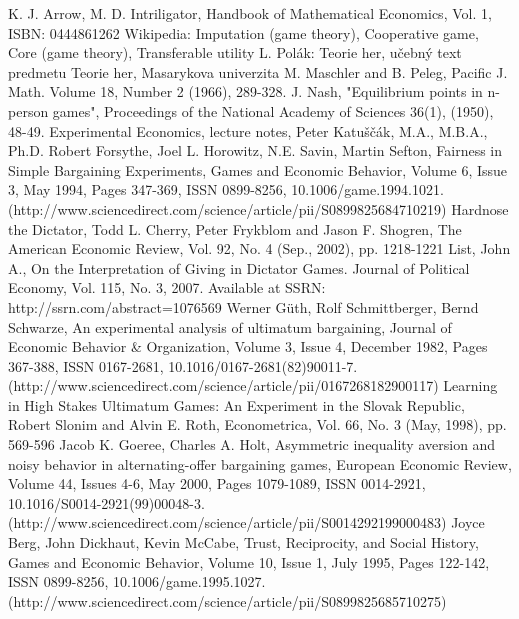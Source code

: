 \documentclass[a5paper,12pt]{article}
\begin{document}
\clearpage
\begin{thebibliography}{9}
    \bibitem{}
    K. J. Arrow, M. D. Intriligator, Handbook of Mathematical Economics, Vol. 1, ISBN: 0444861262
    \bibitem{} 
    Wikipedia: Imputation (game theory), Cooperative game, Core (game theory), Transferable utility
    \bibitem{}
    L. Pol\'ak: Teorie her, u\v{c}ebn\'y text predmetu Teorie her, Masarykova univerzita
    \bibitem{}
    M. Maschler and B. Peleg, Pacific J. Math. Volume 18, Number 2 (1966), 289-328.
    \bibitem{}
    J. Nash, "Equilibrium points in n-person games", Proceedings of the National Academy of Sciences 36(1), (1950), 48-49.
    \bibitem{}
    Experimental Economics, lecture notes, Peter Katuščák, M.A., M.B.A., Ph.D.
    \bibitem{}
    Robert Forsythe, Joel L. Horowitz, N.E. Savin, Martin Sefton, Fairness in Simple Bargaining Experiments, Games and Economic Behavior, Volume 6, Issue 3, May 1994, Pages 347-369, ISSN 0899-8256, 10.1006/game.1994.1021.
(http://www.sciencedirect.com/science/article/pii/S0899825684710219)
    \bibitem{}
    Hardnose the Dictator,
Todd L. Cherry, Peter Frykblom and Jason F. Shogren,
The American Economic Review,
Vol. 92, No. 4 (Sep., 2002), pp. 1218-1221
    \bibitem{}
    List, John A., On the Interpretation of Giving in Dictator Games. Journal of Political Economy, Vol. 115, No. 3, 2007. Available at SSRN: http://ssrn.com/abstract=1076569
    \bibitem{}
    Werner Güth, Rolf Schmittberger, Bernd Schwarze, An experimental analysis of ultimatum bargaining, Journal of Economic Behavior \& Organization, Volume 3, Issue 4, December 1982, Pages 367-388, ISSN 0167-2681, 10.1016/0167-2681(82)90011-7.
(http://www.sciencedirect.com/science/article/pii/0167268182900117)
    \bibitem{}
    Learning in High Stakes Ultimatum Games: An Experiment in the Slovak Republic,
Robert Slonim and Alvin E. Roth,
Econometrica,
Vol. 66, No. 3 (May, 1998), pp. 569-596
    \bibitem{}
    Jacob K. Goeree, Charles A. Holt, Asymmetric inequality aversion and noisy behavior in alternating-offer bargaining games, European Economic Review, Volume 44, Issues 4-6, May 2000, Pages 1079-1089, ISSN 0014-2921, 10.1016/S0014-2921(99)00048-3.
(http://www.sciencedirect.com/science/article/pii/S0014292199000483)
    \bibitem{}
    Joyce Berg, John Dickhaut, Kevin McCabe, Trust, Reciprocity, and Social History, Games and Economic Behavior, Volume 10, Issue 1, July 1995, Pages 122-142, ISSN 0899-8256, 10.1006/game.1995.1027.
(http://www.sciencedirect.com/science/article/pii/S0899825685710275)
\end{thebibliography}
\end{document}
